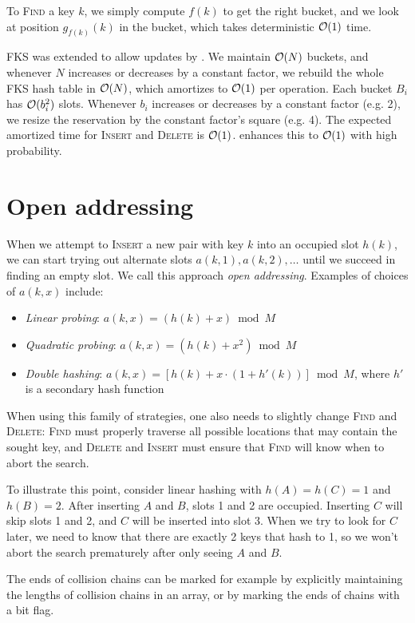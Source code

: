 To \textsc{Find} a key $k$, we simply compute $f(k)$ to get the right bucket,
and we look at position $g_{f(k)}(k)$ in the bucket, which takes deterministic
$\mathcal{O}(1)$ time.

FKS was extended to allow updates by \cite{dyn-ph-bounds}.
We maintain $\mathcal{O}(N)$ buckets, and whenever $N$ increases or decreases by
a constant factor, we rebuild the whole FKS hash table in $\mathcal{O}(N)$, which
amortizes to $\mathcal{O}(1)$ per operation. Each bucket $B_i$ has $\mathcal{O}(b_i^2)$ slots.
Whenever $b_i$ increases or decreases by a constant factor (e.g. 2), we resize
the reservation by the constant factor's square (e.g. 4).
The expected amortized time for \textsc{Insert} and \textsc{Delete} is $\mathcal{O}(1)$.
\cite{univ-class-of-hfns} enhances this to $\mathcal{O}(1)$ with high probability.

\section{Open addressing}
When we attempt to \textsc{Insert} a new pair with key $k$ into an occupied slot
$h(k)$, we can start trying out alternate slots $a(k,1), a(k,2), \ldots$
until we succeed in finding an empty slot. We call this approach \emph{open
addressing}. Examples of choices of $a(k,x)$ include:
\begin{itemize}
\item \emph{Linear probing}: $a(k,x)=(h(k)+x) \bmod M$
\item \emph{Quadratic probing}: $a(k,x)=(h(k)+x^2) \bmod M$
\item \emph{Double hashing}: $a(k,x)=[h(k)+x\cdot (1+h'(k))]\bmod M$, where
$h'$ is a secondary hash function
\end{itemize}

When using this family of strategies, one also needs to slightly change
\textsc{Find} and \textsc{Delete}: \textsc{Find} must properly traverse
all possible locations that may contain the sought key, and \textsc{Delete}
and \textsc{Insert} must ensure that \textsc{Find} will know when to abort
the search.

To illustrate this point, consider linear hashing with $h(A)=h(C)=1$ and
$h(B)=2$. After inserting $A$ and $B$, slots 1 and 2 are occupied.
Inserting $C$ will skip slots 1 and 2, and $C$ will be inserted into slot 3.
When we try to look for $C$ later, we need to know that there are exactly 2 keys
that hash to 1, so we won't abort the search prematurely after only seeing
$A$ and $B$.

The ends of collision chains can be marked for example by explicitly maintaining
the lengths of collision chains in an array, or by marking the ends of chains
with a bit flag.

